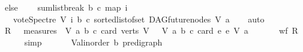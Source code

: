 \begin{isabellebody}
\ else\ \isanewline
\ \ \ sumlist{\isacharunderscore}{\kern0pt}break\ b\ c\ {\isacharparenleft}{\kern0pt}map\ {\isacharparenleft}{\kern0pt}{\isasymlambda}i{\isachardot}{\kern0pt}\isanewline
\ \ \ {\isacharparenleft}{\kern0pt}vote{\isacharunderscore}{\kern0pt}Spectre\ V\ i\ b\ c{\isacharparenright}{\kern0pt}{\isacharparenright}{\kern0pt}\ {\isacharparenleft}{\kern0pt}sorted{\isacharunderscore}{\kern0pt}list{\isacharunderscore}{\kern0pt}of{\isacharunderscore}{\kern0pt}set\ {\isacharparenleft}{\kern0pt}DAG{\isachardot}{\kern0pt}future{\isacharunderscore}{\kern0pt}nodes\ V\ a{\isacharparenright}{\kern0pt}{\isacharparenright}{\kern0pt}{\isacharparenright}{\kern0pt}{\isacharparenright}{\kern0pt}{\isachardoublequoteclose}\isanewline
%
\isadelimproof
\ \ %
\endisadelimproof
%
\isatagproof
{}\isamarkupfalse%
\ auto%
\endisatagproof
{\isafoldproof}%
%
\isadelimproof
\isanewline
%
\endisadelimproof
{}\isamarkupfalse%
\isanewline
%
\isadelimproof
%
\endisadelimproof
%
\isatagproof
{}\isamarkupfalse%
\isanewline
{}\isamarkupfalse%
\ {\isacharquery}{\kern0pt}R\ {\isacharequal}{\kern0pt}\ {\isachardoublequoteopen}\ measures\ {\isacharbrackleft}{\kern0pt}{\isacharparenleft}{\kern0pt}\ {\isasymlambda}{\isacharparenleft}{\kern0pt}V{\isacharcomma}{\kern0pt}\ a{\isacharcomma}{\kern0pt}\ b{\isacharcomma}{\kern0pt}\ c{\isacharparenright}{\kern0pt}{\isachardot}{\kern0pt}\ {\isacharparenleft}{\kern0pt}card\ {\isacharparenleft}{\kern0pt}verts\ V{\isacharparenright}{\kern0pt}{\isacharparenright}{\kern0pt}{\isacharparenright}{\kern0pt}{\isacharcomma}{\kern0pt}\ \ {\isacharparenleft}{\kern0pt}\ {\isasymlambda}{\isacharparenleft}{\kern0pt}V{\isacharcomma}{\kern0pt}\ a{\isacharcomma}{\kern0pt}\ b{\isacharcomma}{\kern0pt}\ c{\isacharparenright}{\kern0pt}{\isachardot}{\kern0pt}\ card\ {\isacharbraceleft}{\kern0pt}e{\isachardot}{\kern0pt}\ e\ {\isasymrightarrow}\isactrlsup {\isacharasterisk}{\kern0pt}\isactrlbsub V\isactrlesub \ a{\isacharbraceright}{\kern0pt}{\isacharparenright}{\kern0pt}{\isacharbrackright}{\kern0pt}\ {\isachardoublequoteclose}\ \ \isanewline
\ \ \isamarkupfalse%
\ {\isachardoublequoteopen}wf\ {\isacharquery}{\kern0pt}R{\isachardoublequoteclose}\isanewline
\ \ \ \ \isamarkupfalse%
\ simp\ \isanewline
{}\isamarkupfalse%
\ \isanewline
\ \ \isamarkupfalse%
\ V{\isacharcolon}{\kern0pt}{\isacharcolon}{\kern0pt}{\isachardoublequoteopen}{\isacharparenleft}{\kern0pt}{\isacharprime}{\kern0pt}a{\isacharcolon}{\kern0pt}{\isacharcolon}{\kern0pt}linorder{\isacharcomma}{\kern0pt}\ {\isacharprime}{\kern0pt}b{\isacharparenright}{\kern0pt}\ pre{\isacharunderscore}{\kern0pt}digraph{\isachardoublequoteclose}\ \isanewline

\end{isabellebody}
